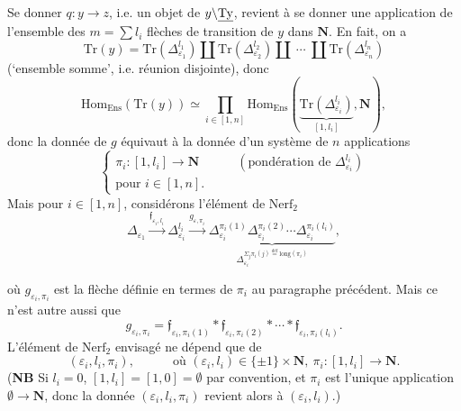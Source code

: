 Se donner $q : y\longrightarrow z$, i.e. un objet de $y\backslash\underline{\mathrm{Ty}}$, revient à se donner une application de l'ensemble des $m=\sum l_i$ flèches de transition de $y$ dans $\mathbf{N}$. En fait, on a %
\[
\mathrm{Tr}(y) = \mathrm{Tr}(\Delta^{l_1}_{\varepsilon_1})\amalg\mathrm{Tr}(\Delta^{l_2}_{\varepsilon_2})\amalg\ \cdots\ \amalg\mathrm{Tr}(\Delta^{l_n}_{\varepsilon_n})
\]
(`ensemble somme', i.e. réunion disjointe), donc
\[
\mathrm{Hom}_{\mathrm{Ens}}(\mathrm{Tr}(y)) \simeq \prod_{i\in[1,n]}\mathrm{Hom}_{\mathrm{Ens}}(\underbrace{\mathrm{Tr}(\Delta^{l_i}_{\varepsilon_i})}_{[1,l_i]},\mathbf{N}), %
\]
donc la donnée de $g$ équivaut à la donnée d'un système de $n$ applications
\[
\left\{
\begin{array}{l}
\pi_i : [1,l_i]\longrightarrow\mathbf{N} \qquad\quad (\text{pondération de }\Delta^{l_i}_{\varepsilon_i})\\[6pt]
\text{pour } i\in[1,n].
\end{array}
\right.
\]
Mais pour $i\in[1,n]$, considérons l'élément de $\mathrm{Nerf}_2$
\[
\Delta_{\varepsilon_1}\xrightarrow{\mathfrak{f}_{\varepsilon_i,l_i}}\Delta^{l_i}_{\varepsilon_i}\xrightarrow{g_{\varepsilon,\pi_i}}\underbrace{\Delta^{\pi_i(1)}_{\varepsilon_i}\Delta^{\pi_i(2)}_{\varepsilon_i}\cdots\Delta^{\pi_i(l_i)}_{\varepsilon_i}}_{\Delta_{\varepsilon_i}^{\Sigma_j\pi_i(j)\overset{\text{déf}}{=}\mathrm{long}(\pi_i)}}, %
\tag*{(1)}
\]

où $g_{\varepsilon_i,\pi_i}$ est la flèche définie en termes de $\pi_i$ au paragraphe précédent. Mais ce n'est autre aussi que
\[
g_{\varepsilon_i,\pi_i} = \mathfrak{f}_{\varepsilon_i,\pi_i(1)}*\mathfrak{f}_{\varepsilon_i,\pi_i(2)}*\cdots*\mathfrak{f}_{\varepsilon_i,\pi_i(l_i)}.
\tag*{(2)}
\]
L'élément de $\mathrm{Nerf}_2$ envisagé ne dépend que de
\[
(\varepsilon_i,l_i,\pi_i), \qquad\quad \text{où } (\varepsilon_i,l_i)\in\{\pm1\}\times\mathbf{N},\ \pi_i : [1,l_i]\longrightarrow\mathbf{N}.
\]
(\textbf{NB} Si $l_i=0$, $[1,l_i]=[1,0]=\emptyset$ par convention, et $\pi_i$ est l'unique application $\emptyset\longrightarrow\mathbf{N}$, donc la donnée $(\varepsilon_i,l_i,\pi_i)$ revient alors à $(\varepsilon_i,l_i)$.)

